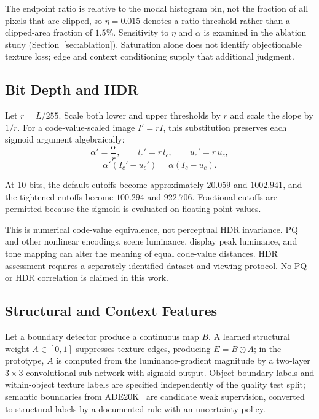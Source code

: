 \documentclass[5p,times,twocolumn]{elsarticle}
\begin{document}
The endpoint ratio is relative to the modal histogram bin, not the fraction of
all pixels that are clipped, so $\eta = 0.015$ denotes a ratio threshold
rather than a clipped-area fraction of $1.5\%$. Sensitivity to $\eta$ and
$\alpha$ is examined in the ablation study (Section~\ref{sec:ablation}).
Saturation alone does not identify objectionable texture loss; edge and
context conditioning supply that additional judgment.

\subsection{Bit Depth and HDR}
\label{sec:bitdepth}

Let $r = L/255$. Scale both lower and upper thresholds by $r$ and scale the
slope by $1/r$. For a code-value-scaled image $I' = rI$, this substitution
preserves each sigmoid argument algebraically:
\begin{equation}
\alpha' = \frac{\alpha}{r}, \qquad l_c' = r\,l_c, \qquad u_c' = r\,u_c,
\label{eq:rescale}
\end{equation}
\begin{equation}
\alpha'(I_c' - u_c') = \alpha(I_c - u_c).
\label{eq:equiv}
\end{equation}

At 10 bits, the default cutoffs become approximately $20.059$ and $1002.941$,
and the tightened cutoffs become $100.294$ and $922.706$. Fractional cutoffs
are permitted because the sigmoid is evaluated on floating-point values.

This is numerical code-value equivalence, not perceptual HDR invariance. PQ
and other nonlinear encodings, scene luminance, display peak luminance, and
tone mapping can alter the meaning of equal code-value distances. HDR
assessment requires a separately identified dataset and viewing protocol. No
PQ or HDR correlation is claimed in this work.

\subsection{Structural and Context Features}
\label{sec:context}

Let a boundary detector produce a continuous map $B$. A learned structural
weight $A \in [0, 1]$ suppresses texture edges, producing $E = B \odot A$;
in the prototype, $A$ is computed from the luminance-gradient magnitude by a
two-layer $3{\times}3$ convolutional sub-network with sigmoid output.
Object-boundary labels and within-object texture labels are specified
independently of the quality test split; semantic boundaries from
ADE20K~\cite{zhou2017ade20k} are candidate weak supervision, converted to
structural labels by a documented rule with an uncertainty policy.
\end{document}
